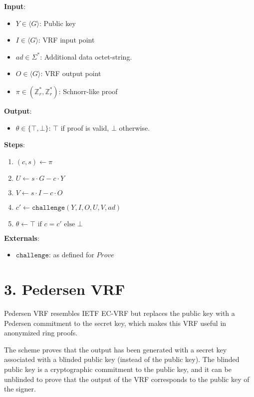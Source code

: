 \documentclass[
]{article}
\providecommand{\tightlist}{%
  \setlength{\itemsep}{0pt}\setlength{\parskip}{0pt}}
\begin{document}
\textbf{Input}:

\begin{itemize}
\tightlist
\item
  \(Y \in \langle G \rangle\): Public key
\item
  \(I \in \langle G \rangle\): VRF input point
\item
  \(ad \in \Sigma^*\): Additional data octet-string.
\item
  \(O \in \langle G \rangle\): VRF output point
\item
  \(\pi \in (\mathbb{Z}^*_r, \mathbb{Z}^*_r)\): Schnorr-like proof
\end{itemize}

\textbf{Output}:

\begin{itemize}
\tightlist
\item
  \(\theta \in \{ \top, \bot \}\): \(\top\) if proof is valid, \(\bot\)
  otherwise.
\end{itemize}

\textbf{Steps}:

\begin{enumerate}
\def\labelenumi{\arabic{enumi}.}
\tightlist
\item
  \((c, s) \gets \pi\)
\item
  \(U \gets s \cdot G - c \cdot Y\)
\item
  \(V \gets s \cdot I - c \cdot O\)
\item
  \(c' \gets \texttt{challenge}(Y, I, O, U, V, ad)\)
\item
  \(\theta \gets \top \text{ if } c = c' \text{ else } \bot\)
\end{enumerate}

\textbf{Externals}:

\begin{itemize}
\tightlist
\item
  \(\texttt{challenge}\): as defined for \(Prove\)
\end{itemize}

\hypertarget{pedersen-vrf}{%
\section{3. Pedersen VRF}\label{pedersen-vrf}}

Pedersen VRF resembles IETF EC-VRF but replaces the public key with a
Pedersen commitment to the secret key, which makes this VRF useful in
anonymized ring proofs.

The scheme proves that the output has been generated with a secret key
associated with a blinded public key (instead of the public key). The
blinded public key is a cryptographic commitment to the public key, and
it can be unblinded to prove that the output of the VRF corresponds to
the public key of the signer.
\end{document}

